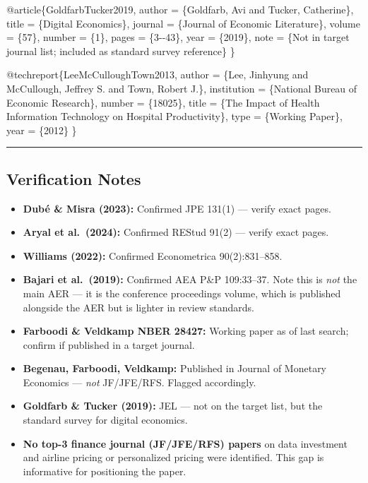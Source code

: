 \documentclass[
]{article}
\newenvironment{Shaded}{\begin{snugshade}}{\end{snugshade}}
\newcommand{\DataTypeTok}[1]{\textcolor[rgb]{0.13,0.29,0.53}{#1}}
\newcommand{\NormalTok}[1]{#1}
\newcommand{\OtherTok}[1]{\textcolor[rgb]{0.56,0.35,0.01}{#1}}
\newcommand{\VariableTok}[1]{\textcolor[rgb]{0.00,0.00,0.00}{#1}}
\providecommand{\tightlist}{%
  \setlength{\itemsep}{0pt}\setlength{\parskip}{0pt}}
\begin{document}
\begin{Shaded}
\begin{Highlighting}[]
\VariableTok{@article}\NormalTok{\{}\OtherTok{GoldfarbTucker2019}\NormalTok{,}
  \DataTypeTok{author}\NormalTok{  = \{Goldfarb, Avi and Tucker, Catherine\},}
  \DataTypeTok{title}\NormalTok{   = \{Digital Economics\},}
  \DataTypeTok{journal}\NormalTok{ = \{Journal of Economic Literature\},}
  \DataTypeTok{volume}\NormalTok{  = \{57\},}
  \DataTypeTok{number}\NormalTok{  = \{1\},}
  \DataTypeTok{pages}\NormalTok{   = \{3{-}{-}43\},}
  \DataTypeTok{year}\NormalTok{    = \{2019\},}
  \DataTypeTok{note}\NormalTok{    = \{Not in target journal list; included as standard survey reference\}}
\NormalTok{\}}

\VariableTok{@techreport}\NormalTok{\{}\OtherTok{LeeMcCulloughTown2013}\NormalTok{,}
  \DataTypeTok{author}\NormalTok{      = \{Lee, Jinhyung and McCullough, Jeffrey S. and Town, Robert J.\},}
  \DataTypeTok{institution}\NormalTok{ = \{National Bureau of Economic Research\},}
  \DataTypeTok{number}\NormalTok{      = \{18025\},}
  \DataTypeTok{title}\NormalTok{       = \{The Impact of Health Information Technology on Hospital Productivity\},}
  \DataTypeTok{type}\NormalTok{        = \{Working Paper\},}
  \DataTypeTok{year}\NormalTok{        = \{2012\}}
\NormalTok{\}}
\end{Highlighting}
\end{Shaded}

\begin{center}\rule{0.5\linewidth}{0.5pt}\end{center}

\hypertarget{verification-notes}{%
\subsection{Verification Notes}\label{verification-notes}}

\begin{itemize}
\tightlist
\item
  \textbf{Dubé \& Misra (2023):} Confirmed JPE 131(1) --- verify exact
  pages.
\item
  \textbf{Aryal et al.~(2024):} Confirmed REStud 91(2) --- verify exact
  pages.
\item
  \textbf{Williams (2022):} Confirmed Econometrica 90(2):831--858.
\item
  \textbf{Bajari et al.~(2019):} Confirmed AEA P\&P 109:33--37. Note
  this is \emph{not} the main AER --- it is the conference proceedings
  volume, which is published alongside the AER but is lighter in review
  standards.
\item
  \textbf{Farboodi \& Veldkamp NBER 28427:} Working paper as of last
  search; confirm if published in a target journal.
\item
  \textbf{Begenau, Farboodi, Veldkamp:} Published in Journal of Monetary
  Economics --- \emph{not} JF/JFE/RFS. Flagged accordingly.
\item
  \textbf{Goldfarb \& Tucker (2019):} JEL --- not on the target list,
  but the standard survey for digital economics.
\item
  \textbf{No top-3 finance journal (JF/JFE/RFS) papers} on data
  investment and airline pricing or personalized pricing were
  identified. This gap is informative for positioning the paper.
\end{itemize}
\end{document}
